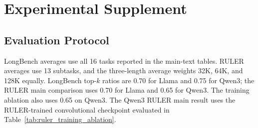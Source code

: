 %
%
%



\section{Experimental Supplement}
\label{app:experimental_details}

\subsection{Evaluation Protocol}
\label{app:evaluation_protocol}

LongBench averages use all 16 tasks reported in the main-text tables.
RULER averages use 13 subtasks, and the three-length average weights
32K, 64K, and 128K equally. LongBench top-$k$ ratios are 0.70 for Llama
and 0.75 for Qwen3; the RULER main comparison uses 0.70 for Llama and
0.65 for Qwen3. The training ablation also uses 0.65 on Qwen3.
The Qwen3 RULER main result uses the RULER-trained convolutional checkpoint
evaluated in Table~\ref{tab:ruler_training_ablation}.

